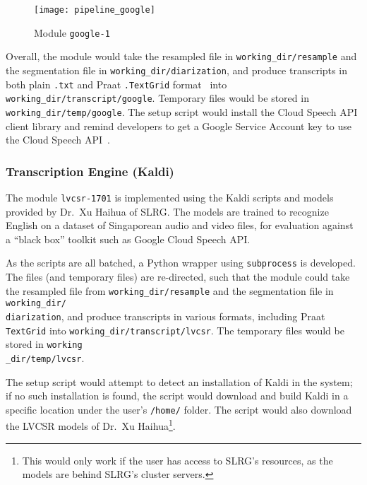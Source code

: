 \begin{figure}[ht]
\begin{center}
    \texttt{[image: pipeline\_google]}
    \caption{Module \texttt{google-1}}\label{google}
\end{center}
\end{figure}

Overall, the module would take the resampled file in
\texttt{working\_dir/resample} and the segmentation file in
\texttt{working\_dir/diarization}, and produce transcripts in both
plain \texttt{.txt} and Praat \texttt{.TextGrid} format~\cite{praat}
into \texttt{working\_dir/transcript/google}.
Temporary files would be stored in \texttt{working\_dir/temp/google}.
The setup script would install the Cloud Speech API client library and
remind developers to get a Google Service Account key to use the
Cloud Speech API~\cite{gcs-api-key}.

\subsubsection{Transcription Engine (Kaldi)}

The module \texttt{lvcsr-1701} is implemented using the Kaldi 
scripts and models provided by Dr.\ Xu Haihua of SLRG\@. The models
are trained to recognize English on a dataset of Singaporean audio and
video files, for evaluation against a ``black box'' toolkit such as
Google Cloud Speech API\@.

As the scripts are all batched, a Python wrapper using \texttt{subprocess}
is developed. The files (and temporary files) are re-directed, such that
the module could take the resampled file from \texttt{working\_dir/resample}
and the segmentation file in \texttt{working\_dir/\\diarization}, and produce
transcripts in various formats, including Praat \texttt{TextGrid} into
\texttt{working\_dir/transcript/lvcsr}. The temporary files would be stored
in \texttt{working\\ \_dir/temp/lvcsr}.

The setup script would attempt to detect an installation of Kaldi in the
system; if no such installation is found, the script would download and
build Kaldi in a specific location under the user's \texttt{/home/} folder.
The script would also download the LVCSR models of Dr.\ Xu Haihua\footnote{
This would only work if the user has access to SLRG's resources, as the
models are behind SLRG's cluster servers.}.

